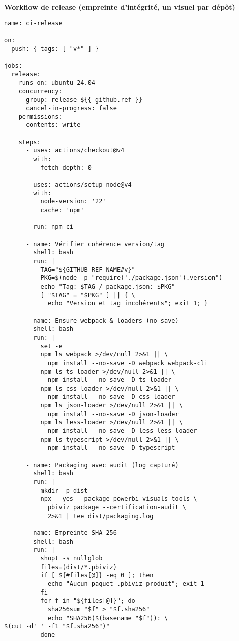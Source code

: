 \noindent\textbf{Workflow de release (empreinte d’intégrité, un visuel par dépôt)}
\begin{verbatim}
name: ci-release

on:
  push: { tags: [ "v*" ] }

jobs:
  release:
    runs-on: ubuntu-24.04
    concurrency:
      group: release-${{ github.ref }}
      cancel-in-progress: false
    permissions:
      contents: write

    steps:
      - uses: actions/checkout@v4
        with:
          fetch-depth: 0

      - uses: actions/setup-node@v4
        with:
          node-version: '22'
          cache: 'npm'

      - run: npm ci

      - name: Vérifier cohérence version/tag
        shell: bash
        run: |
          TAG="${GITHUB_REF_NAME#v}"
          PKG=$(node -p "require('./package.json').version")
          echo "Tag: $TAG / package.json: $PKG"
          [ "$TAG" = "$PKG" ] || { \
            echo "Version et tag incohérents"; exit 1; }

      - name: Ensure webpack & loaders (no-save)
        shell: bash
        run: |
          set -e
          npm ls webpack >/dev/null 2>&1 || \
            npm install --no-save -D webpack webpack-cli
          npm ls ts-loader >/dev/null 2>&1 || \
            npm install --no-save -D ts-loader
          npm ls css-loader >/dev/null 2>&1 || \
            npm install --no-save -D css-loader
          npm ls json-loader >/dev/null 2>&1 || \
            npm install --no-save -D json-loader
          npm ls less-loader >/dev/null 2>&1 || \
            npm install --no-save -D less less-loader
          npm ls typescript >/dev/null 2>&1 || \
            npm install --no-save -D typescript

      - name: Packaging avec audit (log capturé)
        shell: bash
        run: |
          mkdir -p dist
          npx --yes --package powerbi-visuals-tools \
            pbiviz package --certification-audit \
            2>&1 | tee dist/packaging.log

      - name: Empreinte SHA-256
        shell: bash
        run: |
          shopt -s nullglob
          files=(dist/*.pbiviz)
          if [ ${#files[@]} -eq 0 ]; then
            echo "Aucun paquet .pbiviz produit"; exit 1
          fi
          for f in "${files[@]}"; do
            sha256sum "$f" > "$f.sha256"
            echo "SHA256($(basename "$f")): \
$(cut -d' ' -f1 "$f.sha256")"
          done


\end{verbatim}
